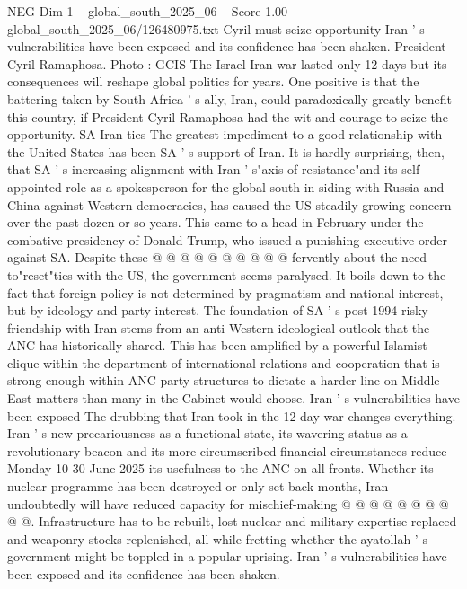 \begin{textsample}{NEG Dim 1 – global\_south\_2025\_06 – Score 1.00 – global\_south\_2025\_06/126480975.txt}  \label{ex:f1_neg_317}
Cyril must seize opportunity Iran ' s vulnerabilities have been exposed and its confidence has been shaken.
President Cyril Ramaphosa.
Photo : GCIS The Israel-Iran war lasted only 12 days but its consequences will reshape global politics for years.
One positive is that the battering taken by South Africa ' s ally, Iran, could paradoxically greatly benefit this country, if President Cyril Ramaphosa had the wit and courage to seize the opportunity.
SA-Iran ties The greatest impediment to a good relationship with the United States has been SA ' s support of Iran.
It is hardly surprising, then, that SA ' s increasing alignment with Iran ' s"axis of resistance"and its self-appointed role as a spokesperson for the global south in siding with Russia and China against Western democracies, has caused the US steadily growing concern over the past dozen or so years.
This came to a head in February under the combative presidency of Donald Trump, who issued a punishing executive order against SA.
Despite these @ @ @ @ @ @ @ @ @ @ fervently about the need to"reset"ties with the US, the government seems paralysed.
It boils down to the fact that foreign policy is not determined by pragmatism and national interest, but by ideology and party interest.
The foundation of SA ' s post-1994 risky friendship with Iran stems from an anti-Western ideological outlook that the ANC has historically shared.
This has been amplified by a powerful Islamist clique within the department of international relations and cooperation that is strong enough within ANC party structures to dictate a harder line on Middle East matters than many in the Cabinet would choose.
Iran ' s vulnerabilities have been exposed The drubbing that Iran took in the 12-day war changes everything.
Iran ' s new precariousness as a functional state, its wavering status as a revolutionary beacon and its more circumscribed financial circumstances reduce Monday 10 30 June 2025 its usefulness to the ANC on all fronts.
Whether its nuclear programme has been destroyed or only set back months, Iran undoubtedly will have reduced capacity for mischief-making @ @ @ @ @ @ @ @ @ @.
Infrastructure has to be rebuilt, lost nuclear and military expertise replaced and weaponry stocks replenished, all while fretting whether the ayatollah ' s government might be toppled in a popular uprising.
Iran ' s vulnerabilities have been exposed and its confidence has been shaken.

\end{textsample}
